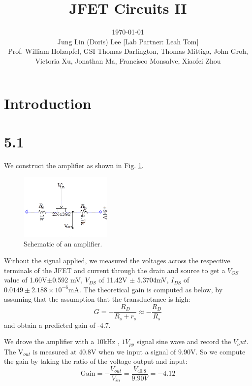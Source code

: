 \documentclass[authoryear, 12pt,5p, times]{elsarticle}
\begin{document}
\begin{frontmatter}
\title{JFET Circuits II}
\author{\today \quad \\Jung Lin (Doris) Lee [Lab Partner: Leah Tom]\\Prof. William Holzapfel, GSI Thomas Darlington, Thomas Mittiga, John Groh,  \\Victoria Xu, Jonathan Ma, Francisco Monsalve, Xiaofei Zhou\vspace{-30pt}}	 
\end{frontmatter}
\section*{Introduction\label{intro}}
 
\section*{5.1}
We construct the amplifier as shown in Fig. \ref{q1setup}.
 \begin{figure}
 \centering
 \includegraphics[width=0.4\textwidth]{figure/q1setup}
\caption{Schematic of an amplifier.}
\label{q1setup}
 \end{figure}
\par Without the signal applied, we measured the voltages across the respective terminals of the JFET and current through the drain and source to get a $V_{GS}$ value of 1.60V$\pm$0.592 mV,  $V_{DS}$ of 11.42V $\pm$ 5.3704mV,  $I_{DS}$ of  $0.0149\pm 2.188\times 10^{-6}$mA. The theoretical gain is computed as below, by assuming that the assumption that the transductance is high: 
\begin{equation}
G = - \frac{R_D}{R_s+r_s}\approx -\frac{R_D}{R_s}
\end{equation}
and obtain a predicted gain of -4.7.
\par We drove the amplifier with a 10kHz , $1V_{pp}$ signal sine wave and record the $V_out$. The V$_{out}$ is measured at 40.8V when we input a signal of 9.90V. So we compute the gain by taking the ratio of the voltage output and input:
\begin{equation}
\text{Gain} = -\frac{V_{out}}{V_{in}}=\frac{V_{40.8}}{9.90V}=-4.12
\label{gain_experimental}
\end{equation}
\end{document}
